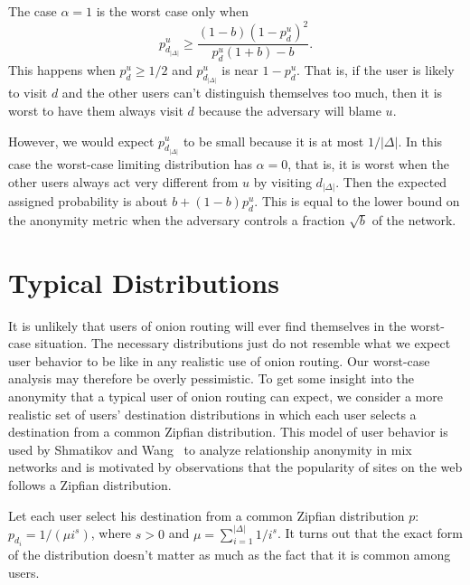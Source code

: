 \documentclass[prodmode,acmtissec]{acmsmall}
\begin{document}
The case $\alpha=1$ is the worst case only when
\begin{equation*}
p^u_{d_{|\Delta|}} \ge \frac{(1-b)(1-p^u_d)^2}{p^u_d(1+b)-b}.
\end{equation*}
This happens when $p^u_d\ge 1/2$ and $p^u_{d_{|\Delta|}}$ is near $1-p^u_d$. That is, if the user is likely to visit $d$ and the other users can't distinguish themselves too much, then it is worst to have them always visit $d$ because the adversary will blame $u$.

However, we would expect $p^u_{d_{|\Delta|}}$ to be small because it is at most $1/|\Delta|$. In this case the worst-case limiting distribution has $\alpha = 0$, that is, it is worst when the other users always act very different from $u$ by visiting $d_{|\Delta|}$. Then the expected assigned probability is about $b + (1-b)p^u_d$. This is equal to the lower bound on the anonymity metric when the adversary controls a fraction $\sqrt{b}$ of the network.

\section{Typical Distributions} \label{sec:typdist}
It is unlikely that users of onion routing will ever find themselves in the worst-case situation.  The necessary distributions just do not resemble what we expect user behavior to be like in any realistic use of onion routing.  Our worst-case analysis may therefore be overly pessimistic.  To get some insight into the anonymity that a typical user of onion routing can expect, we consider a more realistic set of users' destination distributions in which each user selects a destination from a common Zipfian distribution.  This model of user behavior is used by Shmatikov and Wang~ to analyze relationship anonymity in mix networks and is motivated by observations that the popularity of sites on the web follows a Zipfian distribution.

Let each user select his destination from a common Zipfian distribution $p$:  $p_{d_i} = 1/(\mu i^s)$, where $s>0$ and $\mu=\sum_{i=1}^{|\Delta|} 1/i^s$.  It turns out that the exact form of the distribution doesn't matter as much as the fact that it is common among users.
\end{document}
